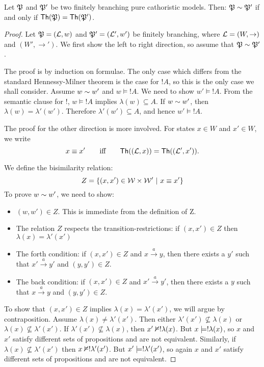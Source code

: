 \begin{theorem}
\label{hennessymilnertheorem}
Let $\frak{P}$ and $\frak{P}'$ be two finitely branching pure cathoristic
models. Then: $\frak{P} \sim \frak{P}'$ if and only if $\mathsf{Th}(\frak{P}) =
\mathsf{Th}(\frak{P}')$. 
\end{theorem}

\begin{proof}
\NI Let $\frak{P} = (\mathcal{L}, w)$ and $\frak{P}' = (\mathcal{L}', w')$ be finitely
branching, where $\mathcal{L} = (W, \rightarrow)$ and $(W', \rightarrow')$.
We first show the left to right direction, so assume that $\frak{P} \sim
\frak{P}'$.

The proof is by induction on formulae.  The only case which differs
from the standard Hennessy-Milner theorem is the case for $!A$, so
this is the only case we shall consider.  Assume $w \sim w'$ and $w
\models !A$. We need to show $w' \models !A$.
From the semantic clause for $!$, $w \models !A$ implies $\lambda(w)
\subseteq A$.  If $w \sim w'$, then $\lambda(w) = \lambda'(w')$.
Therefore $\lambda'(w') \subseteq A$, and hence $w' \models !A$.

The proof for the other direction is more involved.
For states $x \in W$ and $x' \in W$, we write 
\[
   x \equiv x'
      \qquad\text{iff}\qquad
   \mathsf{Th}((\mathcal{L}, x)) = \mathsf{Th}((\mathcal{L}', x')).
\]

We define the bisimilarity relation:
\[
   Z = \{(x,x') \in \mathcal{W} \times \mathcal{W}' \ | \  x \equiv x' \}
\]
To prove $w \sim w'$, we need to show:
\begin{itemize}

\item $(w,w') \in Z$. This is immediate from the definition of Z.

\item The relation $Z$ respects the transition-restrictions: if
  $(x,x') \in Z$ then $\lambda(x) = \lambda'(x')$

\item The forth condition: if $(x,x') \in Z$ and $x \xrightarrow{a}
  y$, then there exists a $y'$ such that $x' \xrightarrow{a} y'$ and $(y, y') \in Z$.

\item The back condition: if $(x,x') \in Z$ and $x' \xrightarrow{a}
  y'$, then there exists a $y$ such that $x \xrightarrow{a} y$ and $(y, y') \in Z$.

\end{itemize}
To show that $(x,x') \in Z$ implies $\lambda(x) = \lambda'(x')$, we
will argue by contraposition.  Assume $\lambda(x) \neq \lambda'(x')$.
Then either $\lambda'(x') \nsubseteq \lambda(x)$ or $\lambda(x)
\nsubseteq \lambda'(x')$.  If $\lambda'(x') \nsubseteq \lambda(x)$,
then $x' \nvDash ! \lambda(x)$.  But $x \models !
\lambda(x)$, so $x$ and $x'$ satisfy different sets of propositions
and are not equivalent.  Similarly, if $\lambda(x) \nsubseteq
\lambda'(x')$ then $x \nvDash ! \lambda'(x')$.  But $x' \models
! \lambda'(x')$, so again $x$ and $x'$ satisfy different sets of
propositions and are not equivalent.


\end{proof}
